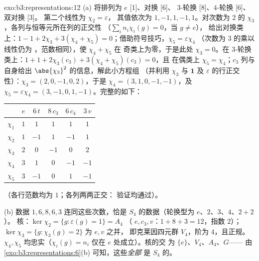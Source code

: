 \begin{solution}{exo:b3:representations:12}
(a) 将排列为 $e$ [1]、对换 [6]、
$3$-轮换 [8]、$4$-轮换 [6]、双对换 [3]。
第二个线性为 $\chi_2 = \varepsilon$，
其值依次为 $1, -1, 1, -1, 1$。对次数为 $2$ 的
 $\chi_3$，各列与恒等元所在列的正交性
（$\sum_in_i\chi_i(g) = 0$，当 $g \neq e$），
给出对换类上：$1 - 1 + 2\chi_3 + 3(\chi_4 +
\chi_5) = 0$；借助符号技巧，$\chi_5 = \varepsilon\chi_4$
（次数为 $3$ 的乘以线性仍为
，范数相同），使 $\chi_4 + \chi_5$ 在
奇类上为零，于是此处 $\chi_3 = 0$。在 $3$-轮换类上：$1 + 1 +
2\chi_3(c_3) + 3(\chi_4 + \chi_5)(c_3) = 0$，且
在偶类上 $\chi_5 = \chi_4$；$c_3$ 列与
自身给出 $\abs{\chi_3}^2$ 的信息，解此小方程组
（并利用 $\chi_3$ 与 $\mathbf 1$ 及
$\varepsilon$ 的行正交性）：$\chi_3 = (2, 0, -1, 0, 2)$，于是 $\chi_4 =
(3, 1, 0, -1, -1)$，及 $\chi_5 = \varepsilon\chi_4 = (3, -1,
0, 1, -1)$。完整的如下：
\begin{center}
\begin{tabular}{c|ccccc}
 & $e$ & $6\,t$ & $8\,c_3$ & $6\,c_4$ & $3\,v$\\
\hline
$\chi_1$ & $1$ & $1$ & $1$ & $1$ & $1$\\
$\chi_2$ & $1$ & $-1$ & $1$ & $-1$ & $1$\\
$\chi_3$ & $2$ & $0$ & $-1$ & $0$ & $2$\\
$\chi_4$ & $3$ & $1$ & $0$ & $-1$ & $-1$\\
$\chi_5$ & $3$ & $-1$ & $0$ & $1$ & $-1$\\
\end{tabular}
\end{center}
（各行范数均为 $1$；各列两两正交：
验证均通过）。

(b) 数据 $1, 6, 8, 6, 3$ 连同这些次数，恰是
$S_4$ 的数据（轮换型为 $e$、$2$、$3$、$4$、$2{+}2$）。
核：$\ker\chi_2 = \{g : \varepsilon(g) = 1\} = A_4$
（ $e, c_3, v$：$1 + 8 + 3 = 12$，指数 $2$）；
$\ker\chi_3 = \{g : \chi_3(g) = 2\}$ 为 $e, v$ 之并，
即克莱因四元群 $V_4$，阶为 $4$，且正规。$\chi_4, \chi_5$
均忠实（$\chi_i(g) = n_i$ 仅在 $e$ 处成立）。核的交
为 $\{e\}$、$V_4$、$A_4$、$G$——
由\cref{exo:b3:representations:6}(b) 可知，这些\emph{全部}
是 $S_4$ 的。


\end{solution}
